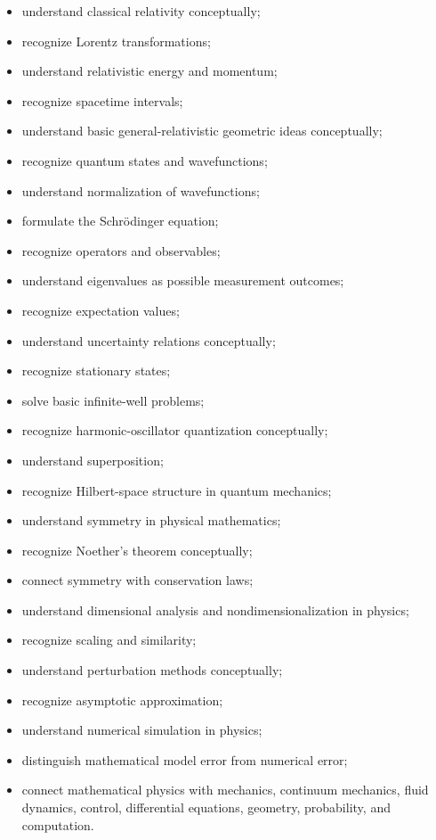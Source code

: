 {\begin{itemize}
    \item understand classical relativity conceptually;
    \item recognize Lorentz transformations;
    \item understand relativistic energy and momentum;
    \item recognize spacetime intervals;
    \item understand basic general-relativistic geometric ideas conceptually;
    \item recognize quantum states and wavefunctions;
    \item understand normalization of wavefunctions;
    \item formulate the Schrödinger equation;
    \item recognize operators and observables;
    \item understand eigenvalues as possible measurement outcomes;
    \item recognize expectation values;
    \item understand uncertainty relations conceptually;
    \item recognize stationary states;
    \item solve basic infinite-well problems;
    \item recognize harmonic-oscillator quantization conceptually;
    \item understand superposition;
    \item recognize Hilbert-space structure in quantum mechanics;
    \item understand symmetry in physical mathematics;
    \item recognize Noether's theorem conceptually;
    \item connect symmetry with conservation laws;
    \item understand dimensional analysis and nondimensionalization in physics;
    \item recognize scaling and similarity;
    \item understand perturbation methods conceptually;
    \item recognize asymptotic approximation;
    \item understand numerical simulation in physics;
    \item distinguish mathematical model error from numerical error;
    \item connect mathematical physics with mechanics, continuum mechanics,
          fluid dynamics, control, differential equations, geometry,
          probability, and computation.
\end{itemize}
}

